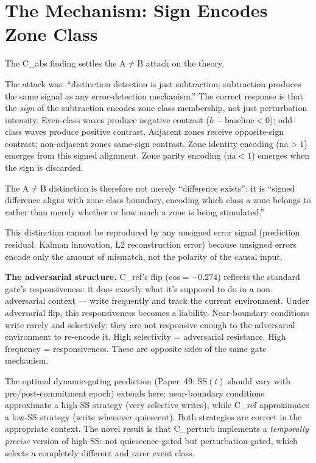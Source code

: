 \documentclass[11pt,a4paper]{article}
\begin{document}
\section{The Mechanism: Sign Encodes Zone Class}

The C\_abs finding settles the A$\neq$B attack on the theory.

The attack was: ``distinction detection is just subtraction; subtraction produces
the same signal as any error-detection mechanism.''
The correct response is that the \emph{sign} of the subtraction encodes
zone class membership, not just perturbation intensity.
Even-class waves produce negative contrast ($h - \mathrm{baseline} < 0$);
odd-class waves produce positive contrast.
Adjacent zones receive opposite-sign contrast; non-adjacent zones same-sign contrast.
Zone identity encoding (na$>1$) emerges from this signed alignment.
Zone parity encoding (na$<1$) emerges when the sign is discarded.

The A$\neq$B distinction is therefore not merely ``difference exists'':
it is ``signed difference aligns with zone class boundary,
encoding which class a zone belongs to rather than merely
whether or how much a zone is being stimulated.''

This distinction cannot be reproduced by any unsigned error signal
(prediction residual, Kalman innovation, L2 reconstruction error)
because unsigned errors encode only the amount of mismatch,
not the polarity of the causal input.

\textbf{The adversarial structure.}
C\_ref's flip (cos$=-0.274$) reflects the standard gate's responsiveness:
it does exactly what it's supposed to do in a non-adversarial context ---
write frequently and track the current environment.
Under adversarial flip, this responsiveness becomes a liability.
Near-boundary conditions write rarely and selectively; they are not responsive
enough to the adversarial environment to re-encode it.
High selectivity = adversarial resistance.
High frequency = responsiveness.
These are opposite sides of the same gate mechanism.

The optimal dynamic-gating prediction (Paper~49: SS$(t)$ should vary with
pre/post-commitment epoch) extends here:
near-boundary conditions approximate a high-SS strategy (very selective writes),
while C\_ref approximates a low-SS strategy (write whenever quiescent).
Both strategies are correct in the appropriate context.
The novel result is that C\_perturb implements a \emph{temporally precise} version
of high-SS: not quiescence-gated but perturbation-gated, which selects a
completely different and rarer event class.
\end{document}
